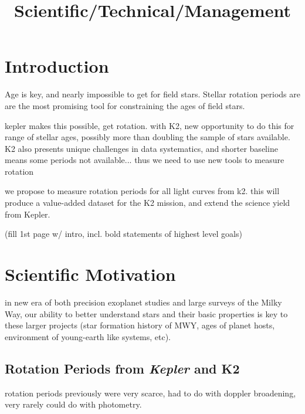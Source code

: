 \documentclass[12pt]{article}
\newcommand{\Kepler}{\textsl{Kepler}\xspace}
\begin{document}


\title{Scientific/Technical/Management}
\date{}

\maketitle


\vspace{-1in}

\section{Introduction}

Age is key, and nearly impossible to get for field stars. 
Stellar rotation periods are are the most promising tool for constraining the ages of field stars.

kepler makes this possible, get rotation. with K2, new opportunity to do this for range of stellar ages, possibly more than doubling the sample of stars available. K2 also presents unique challenges in data systematics, and shorter baseline means some periods not available... thus we need to use new tools to measure rotation

we propose to measure rotation periods for all light curves from k2. this will produce a value-added dataset for the K2 mission, and extend the science yield from Kepler.

(fill 1st page w/ intro, incl. bold statements of highest level goals)
\clearpage



\section{Scientific Motivation}
in new era of both precision exoplanet studies and large surveys of the Milky Way, our ability to better understand stars and their basic properties is key to these larger projects (star formation history of MWY, ages of planet hosts, environment of young-earth like systems, etc).


\subsection{Rotation Periods from \Kepler and K2}
rotation periods previously were very scarce, had to do with doppler broadening, very rarely could do with photometry.
\end{document}
